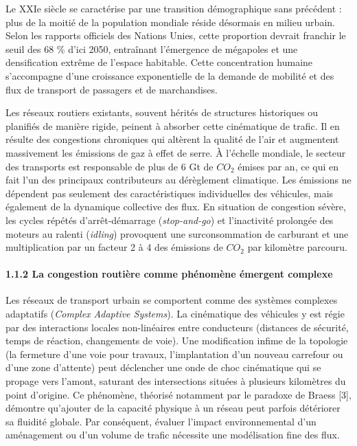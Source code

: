 \documentclass[10pt, a4paper]{article}
\begin{document}
Le XXIe siècle se caractérise par une transition démographique sans
précédent : plus de la moitié de la population mondiale réside désormais
en milieu urbain. Selon les rapports officiels des Nations Unies, cette
proportion devrait franchir le seuil des 68 \% d'ici 2050, entraînant
l'émergence de mégapoles et une densification extrême de l'espace
habitable. Cette concentration humaine s'accompagne d'une croissance
exponentielle de la demande de mobilité et des flux de transport de
passagers et de marchandises.

Les réseaux routiers existants, souvent hérités de structures
historiques ou planifiés de manière rigide, peinent à absorber cette
cinématique de trafic. Il en résulte des congestions chroniques qui
altèrent la qualité de l'air et augmentent massivement les émissions de
gaz à effet de serre. À l'échelle mondiale, le secteur des transports
est responsable de plus de 6 Gt de \(CO_2\) émises par an, ce qui en
fait l'un des principaux contributeurs au dérèglement climatique. Les
émissions ne dépendent pas seulement des caractéristiques individuelles
des véhicules, mais également de la dynamique collective des flux. En
situation de congestion sévère, les cycles répétés d'arrêt-démarrage
(\emph{stop-and-go}) et l'inactivité prolongée des moteurs au ralenti
(\emph{idling}) provoquent une surconsommation de carburant et une
multiplication par un facteur 2 à 4 des émissions de \(CO_2\) par
kilomètre parcouru.

\paragraph{1.1.2 La congestion routière comme phénomène émergent
complexe}\label{la-congestion-routiuxe8re-comme-phuxe9nomuxe8ne-uxe9mergent-complexe}

Les réseaux de transport urbain se comportent comme des systèmes
complexes adaptatifs (\emph{Complex Adaptive Systems}). La cinématique
des véhicules y est régie par des interactions locales non-linéaires
entre conducteurs (distances de sécurité, temps de réaction, changements
de voie). Une modification infime de la topologie (la fermeture d'une
voie pour travaux, l'implantation d'un nouveau carrefour ou d'une zone
d'attente) peut déclencher une onde de choc cinématique qui se propage
vers l'amont, saturant des intersections situées à plusieurs kilomètres
du point d'origine. Ce phénomène, théorisé notamment par le paradoxe de
Braess {[}3{]}, démontre qu'ajouter de la capacité physique à un réseau
peut parfois détériorer sa fluidité globale. Par conséquent, évaluer
l'impact environnemental d'un aménagement ou d'un volume de trafic
nécessite une modélisation fine des flux.
\end{document}
